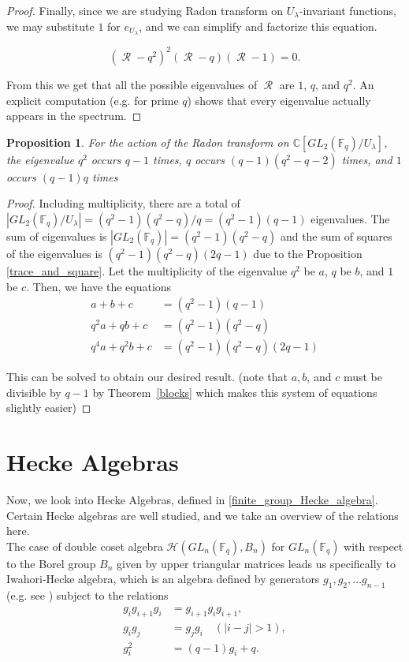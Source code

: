 \documentclass[12pt,reqno]{amsart}
\newtheorem{prop}[thm]{Proposition}
\theoremstyle{definition}
\theoremstyle{remark}
\newcommand{\thmref}[1]{Theorem~\ref{#1}}
\numberwithin{equation}{section}
\newcommand{\CC}{\mathbb{C}}
\newcommand{\GL}[1]{GL_{#1}(\mathbb{F}_q)}
\DeclareMathOperator{\R}{\mathcal{R}}
\begin{document}
\begin{proof}
Finally, since we are studying Radon transform on $U_\lambda$-invariant functions, we may substitute $1$ for $e_{U_{\lambda}}$, and we can simplify and factorize this equation.

\begin{equation*}
    (\R - q^2)^2(\R - q)(\R -1) = 0.
\end{equation*}
 
From this we get that all the possible eigenvalues of $\R$ are $1$, $q$, and $q^2$. An explicit computation (e.g. for prime $q$) shows that every eigenvalue actually appears in the spectrum.
\end{proof}

\begin{prop}
    For the action of the Radon transform on $\CC[\GL{2}/U_{\lambda}]$, the eigenvalue $q^2$ occurs $q-1$ times, $q$ occurs $(q-1)(q^2-q-2)$ times, and $1$ occurs $(q-1)q$ times
\end{prop}

\begin{proof}
    Including multiplicity, there are a total of $|\GL{2} / U_\lambda| = (q^2-1)(q^2-q)/q = (q^2-1)(q-1)$ eigenvalues. The sum of eigenvalues is $|\GL{2}| = (q^2-1)(q^2-q)$ and the sum of squares of the eigenvalues is $(q^2-1)(q^2-q)(2q-1)$ due to the Proposition \ref{trace_and_square}. Let the multiplicity of the eigenvalue $q^2$ be $a$, $q$ be $b$, and $1$ be $c$. Then, we have the equations
    \begin{align*}
        a+b+c &= (q^2-1)(q-1)\\
        q^2a+qb+c &= (q^2-1)(q^2-q)\\
        q^4a+q^2b+c &= (q^2-1)(q^2-q)(2q-1)
    \end{align*}

    This can be solved to obtain our desired result. (note that $a, b$, and $c$ must be divisible by $q-1$ by \thmref{blocks} which makes this system of equations slightly easier)
\end{proof}


\section{Hecke Algebras}

Now, we look into Hecke Algebras, defined in \ref{finite_group_Hecke_algebra}. Certain Hecke algebras are well studied, and we take an overview of the relations here.\\

The case of double coset algebra $\mathcal{H}(\GL{n},B_n)$ for $\GL{n}$ with respect to the Borel group $B_n$ given by upper triangular matrices leads us specifically to Iwahori-Hecke algebra, which is an algebra defined by generators $g_1, g_2, \dots g_{n-1}$ (e.g. see \cite{DB}) subject to the relations
\begin{align*}
g_i g_{i+1} g_i &= g_{i+1}g_i g_{i+1},\\
g_i g_j &= g_j g_i \quad (|i-j| > 1),\\
g_i^2 &= (q-1)g_i+q.
\end{align*}
\end{document}
